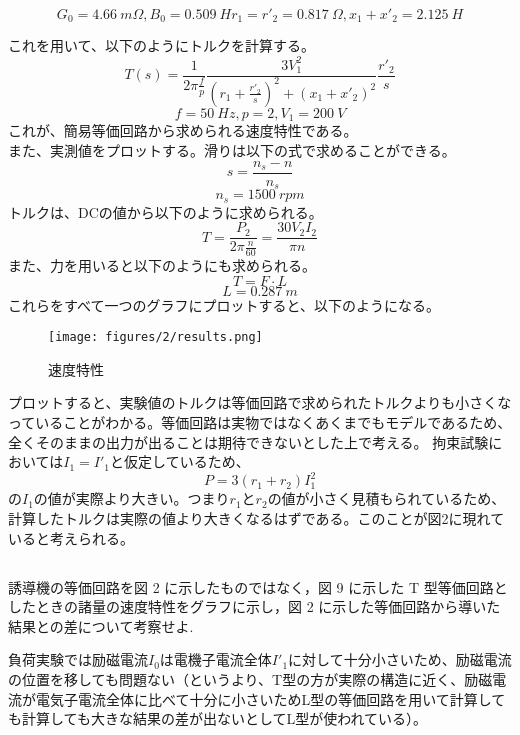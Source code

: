 \documentclass{ltjsarticle}
\begin{document}
\[
G_0 = \SI{4.66}{m\Omega}, B_0 = \SI{0.509}{H} r_1=r'_2 = \SI{0.817}{\Omega}, x_1+x'_2 = \SI{2.125}{H}
\]

これを用いて、以下のようにトルクを計算する。
\[
T(s) = \frac{1}{2\pi\frac{f}{p}}\frac{3V^2_1}{\left(r_1+\frac{r'_2}{s}\right)^2+(x_1+x'_2)^2}\frac{r'_2}{s}
\]
\[
f=\SI{50}{Hz}, p=2, V_1 = \SI{200}{V}
\]
これが、簡易等価回路から求められる速度特性である。\\
また、実測値をプロットする。滑りは以下の式で求めることができる。
\[
s = \frac{n_s-n}{n_s}
\]
\[
n_s = \SI{1500}{rpm}    
\]
トルクは、DCの値から以下のように求められる。
\[
T = \frac{P_2}{2\pi\frac{n}{60}} = \frac{30V_2I_2}{\pi n}
\]
また、力を用いると以下のようにも求められる。
\[
T = F \cdot L    
\]
\[
L = \SI{0.287}{m}
\]
これらをすべて一つのグラフにプロットすると、以下のようになる。
\begin{figure}[H]
    \begin{center}
        \texttt{[image: figures/2/results.png]}
        \caption{速度特性}
    \end{center}
\end{figure}
プロットすると、実験値のトルクは等価回路で求められたトルクよりも小さくなっていることがわかる。等価回路は実物ではなくあくまでもモデルであるため、全くそのままの出力が出ることは期待できないとした上で考える。
拘束試験においては$I_1 = I'_1$と仮定しているため、
\[
    P = 3(r_1+r_2)I^2_1
\]
の$I_1$の値が実際より大きい。つまり$r_1$と$r_2$の値が小さく見積もられているため、計算したトルクは実際の値より大きくなるはずである。このことが図2に現れていると考えられる。

\subsection{}
誘導機の等価回路を図 2 に示したものではなく，図 9 に示した T 型等価回路としたときの諸量の速度特性をグラフに示し，図 2 に示した等価回路から導いた結果との差について考察せよ.

負荷実験では励磁電流$I_0$は電機子電流全体$I'_1$に対して十分小さいため、励磁電流の位置を移しても問題ない（というより、T型の方が実際の構造に近く、励磁電流が電気子電流全体に比べて十分に小さいためL型の等価回路を用いて計算しても計算しても大きな結果の差が出ないとしてL型が使われている）。
\end{document}
